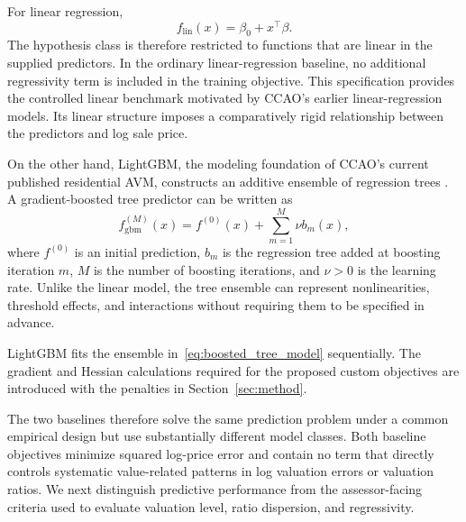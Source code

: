 \documentclass[10pt]{article}
\theoremstyle{definition}
\newcommand{\1}{\mathbf{1}}
\begin{document}
For linear regression,
\begin{equation}
\label{eq:linear_model}
f_{\mathrm{lin}}(x)
=
\beta_0+x^\top\beta.
\end{equation}
The hypothesis class is therefore restricted to functions that are linear in the supplied predictors. In the ordinary linear-regression baseline, no additional regressivity term is included in the training objective. This specification provides the controlled linear benchmark motivated by CCAO's earlier linear-regression models. Its linear structure imposes a comparatively rigid relationship between the predictors and log sale price.


{On the other hand, LightGBM, the modeling foundation of CCAO's current published residential AVM, constructs an additive ensemble of regression trees \cite{CCAOModelResAVM2026,lightgbm}. A gradient-boosted tree predictor can be written as}
\begin{equation}
\label{eq:boosted_tree_model}
f_{\mathrm{gbm}}^{(M)}(x)
=
f^{(0)}(x)
+
\sum_{m=1}^{M}\nu b_m(x),
\end{equation}
where $f^{(0)}$ is an initial prediction, $b_m$ is the regression tree added at boosting iteration $m$, $M$ is the number of boosting iterations, and $\nu>0$ is the learning rate. Unlike the linear model, the tree ensemble can represent nonlinearities, threshold effects, and interactions without requiring them to be specified in advance.

LightGBM fits the ensemble in~\eqref{eq:boosted_tree_model} sequentially. The gradient and Hessian calculations required for the proposed custom objectives are introduced with the penalties in Section~\ref{sec:method}.

The two baselines therefore solve the same prediction problem under a common empirical design but use substantially different model classes.
{Both baseline objectives minimize squared log-price error and contain no term that directly controls systematic value-related patterns in log valuation errors or valuation ratios. We next distinguish predictive performance from the assessor-facing criteria used to evaluate valuation level, ratio dispersion, and regressivity.}
\end{document}
